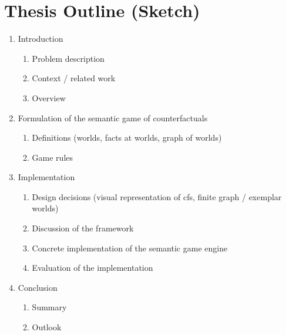 \documentclass[a4paper,american]{paper}
\begin{document}
\section*{Thesis Outline (Sketch)}

\begin{enumerate}
	\item Introduction
	\begin{enumerate}
		\item Problem description
		\item Context / related work
		\item Overview
	\end{enumerate}
	\item Formulation of the semantic game of counterfactuals
	\begin{enumerate}
		\item Definitions (worlds, facts at worlds, graph of worlds)
		\item Game rules
	\end{enumerate}
	\item Implementation
	\begin{enumerate}
		\item Design decisions (visual representation of cfs, finite graph / exemplar worlds)
		\item Discussion of the framework
		\item Concrete implementation of the semantic game engine
		\item Evaluation of the implementation
	\end{enumerate}
	\item Conclusion
	\begin{enumerate}
		\item Summary
		\item Outlook
	\end{enumerate}
\end{enumerate}


\nocite{*}

\end{document}
